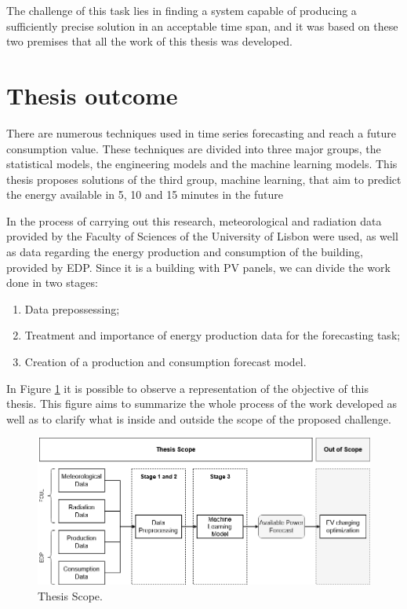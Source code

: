 The challenge of this task lies in finding a system capable of producing a sufficiently precise solution in an acceptable time span, and it was based on these two premises that all the work of this thesis was developed.

\section{Thesis outcome}


There are numerous techniques used in time series forecasting and reach a future consumption value. These techniques are divided into three major groups, the statistical models, the engineering models and the machine learning models. This thesis proposes solutions of the third group, machine learning, that aim to predict the energy available in 5, 10 and 15 minutes in the future

In the process of carrying out this research, meteorological and radiation data provided by the Faculty of Sciences of the University of Lisbon were used, as well as data regarding the energy production and consumption of the building, provided by \ac{EDP}.
Since it is a building with \ac{PV} panels, we can divide the work done in two stages:
\begin{enumerate}[noitemsep,topsep=0pt]
  \itemsep0em 
  \item Data prepossessing;
  \item Treatment and importance of energy production data for the forecasting task;
  \item Creation of a production and consumption forecast model.
\end{enumerate}



In Figure  \ref{scope} it is possible to observe a representation of the objective of this thesis. This figure aims to summarize the whole process of the work developed as well as to clarify what is inside and outside the scope of the proposed challenge.

\begin{figure}[h!]
    \centering
    \begin{center}
    \includegraphics[width=1\textwidth]{Images/Thesis_objective.png}
    \caption{Thesis Scope.}
    \label{scope}
    \end{center}
\end{figure}

